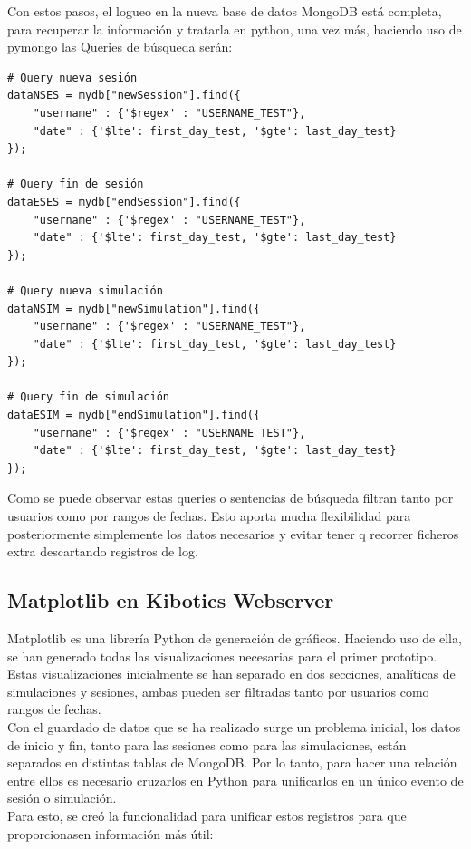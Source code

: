 \documentclass[11pt,a4paper]{book}
\begin{document}
			Con estos pasos, el logueo en la nueva base de datos MongoDB está completa, para recuperar la información y tratarla en python, una vez más, haciendo uso de pymongo las Queries de búsqueda serán:
		
		
			\begin{Verbatim}[tabsize=4]
# Query nueva sesión
dataNSES = mydb["newSession"].find({
	"username" : {'$regex' : "USERNAME_TEST"}, 
	"date" : {'$lte': first_day_test, '$gte': last_day_test}
});

# Query fin de sesión	
dataESES = mydb["endSession"].find({
	"username" : {'$regex' : "USERNAME_TEST"}, 
	"date" : {'$lte': first_day_test, '$gte': last_day_test}
});

# Query nueva simulación
dataNSIM = mydb["newSimulation"].find({
	"username" : {'$regex' : "USERNAME_TEST"}, 
	"date" : {'$lte': first_day_test, '$gte': last_day_test}
});

# Query fin de simulación
dataESIM = mydb["endSimulation"].find({
	"username" : {'$regex' : "USERNAME_TEST"},
	"date" : {'$lte': first_day_test, '$gte': last_day_test}
});

			\end{Verbatim}	
			
			Como se puede observar estas queries o sentencias de búsqueda filtran tanto por usuarios como por rangos de fechas. Esto aporta mucha flexibilidad para posteriormente simplemente los datos necesarios y evitar tener q recorrer ficheros extra descartando registros de log.
			
			\subsection{Matplotlib en Kibotics Webserver}
			Matplotlib es una librería Python de generación de gráficos. Haciendo uso de ella, se han generado todas las visualizaciones necesarias para el primer prototipo.\\
						
			Estas visualizaciones inicialmente se han separado en dos secciones, analíticas de simulaciones y sesiones, ambas pueden ser filtradas tanto por usuarios como rangos de fechas.\\
			
			Con el guardado de datos que se ha realizado surge un problema inicial, los datos de inicio y fin, tanto para las sesiones como para las simulaciones, están separados en distintas tablas de MongoDB. Por lo tanto, para hacer una relación entre ellos es necesario cruzarlos en Python para unificarlos en un único evento de sesión o simulación. \\
			Para esto, se creó la funcionalidad para unificar estos registros para que proporcionasen información más útil:
			
\end{document}
